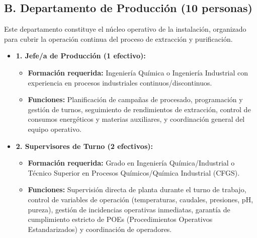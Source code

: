 \subsection{B. Departamento de Producción (10 personas)}

Este departamento constituye el núcleo operativo de la instalación, organizado para cubrir la operación continua del proceso de extracción y purificación.

\begin{itemize}[leftmargin=*]
    \item \textbf{1. Jefe/a de Producción (1 efectivo):}
          \begin{itemize}
              \item \textbf{Formación requerida:} Ingeniería Química o Ingeniería Industrial con experiencia en procesos industriales continuos/discontinuos.
              \item \textbf{Funciones:} Planificación de campañas de procesado, programación y gestión de turnos, seguimiento de rendimientos de extracción, control de consumos energéticos y materias auxiliares, y coordinación general del equipo operativo.
          \end{itemize}

    \item \textbf{2. Supervisores de Turno (2 efectivos):}
          \begin{itemize}
              \item \textbf{Formación requerida:} Grado en Ingeniería Química/Industrial o Técnico Superior en Procesos Químicos/Química Industrial (CFGS).
              \item \textbf{Funciones:} Supervisión directa de planta durante el turno de trabajo, control de variables de operación (temperaturas, caudales, presiones, pH, pureza), gestión de incidencias operativas inmediatas, garantía de cumplimiento estricto de POEs (Procedimientos Operativos Estandarizados) y coordinación de operadores.
          \end{itemize}


\end{itemize}
